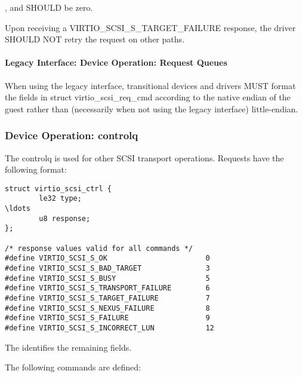 ,  and  SHOULD be zero.

Upon receiving a VIRTIO_SCSI_S_TARGET_FAILURE response, the driver
SHOULD NOT retry the request on other paths.

\paragraph{Legacy Interface: Device Operation: Request Queues}\label{sec:Device Types / SCSI Host Device / Device Operation / Device Operation: Request Queues / Legacy Interface: Device Operation: Request Queues}
When using the legacy interface, transitional devices and drivers
MUST format the fields in struct virtio_scsi_req_cmd
according to the native endian of the guest rather than
(necessarily when not using the legacy interface) little-endian.

\subsubsection{Device Operation: controlq}\label{sec:Device Types / SCSI Host Device / Device Operation / Device Operation: controlq}

The controlq is used for other SCSI transport operations.
Requests have the following format:

\begin{lstlisting}
struct virtio_scsi_ctrl {
        le32 type;
\ldots
        u8 response;
};

/* response values valid for all commands */
#define VIRTIO_SCSI_S_OK                       0
#define VIRTIO_SCSI_S_BAD_TARGET               3
#define VIRTIO_SCSI_S_BUSY                     5
#define VIRTIO_SCSI_S_TRANSPORT_FAILURE        6
#define VIRTIO_SCSI_S_TARGET_FAILURE           7
#define VIRTIO_SCSI_S_NEXUS_FAILURE            8
#define VIRTIO_SCSI_S_FAILURE                  9
#define VIRTIO_SCSI_S_INCORRECT_LUN            12
\end{lstlisting}

The  identifies the remaining fields.

The following commands are defined:

